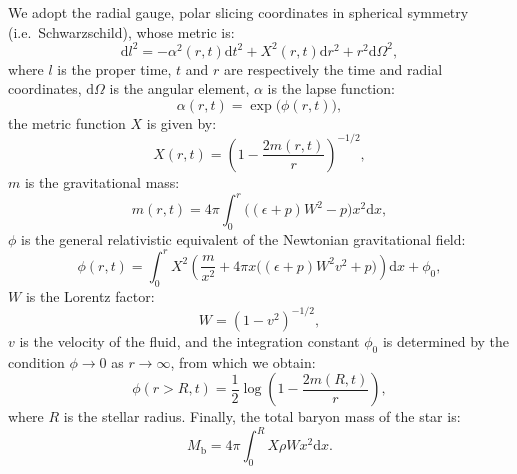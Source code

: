 \documentclass[aps,prd,twocolumn,a4paper,floatfix,nofootbib,superscriptaddress,nofootinbib]{revtex4}
\begin{document}
We adopt the radial gauge, polar slicing coordinates in spherical symmetry
(i.e.~Schwarzschild), whose metric is:
%
\begin{equation}
\label{eq:metric}
%
\mathrm dl^2= 
-\alpha^2(r,t)\mathrm dt^2 + X^2(r,t) \mathrm dr^2
+r^2\mathrm d\Omega^2,
%
\end{equation}
%
where $l$ is the proper time, $t$ and $r$ are respectively the time and radial
coordinates, $\mathrm d\Omega$ is the angular element, $\alpha$ is the
lapse function:
%
\begin{equation}
\label{eq:alpha}
\alpha(r,t)=\exp\big(\phi(r,t)\big),
\end{equation}
%
the metric function $X$ is given by:
%
\begin{equation}
\label{eq:x}
X(r,t)=\left(1 - \frac{2m(r,t)}r\right)^{-1/2},
\end{equation}
%
$m$ is the gravitational mass:
%
\begin{equation}
\label{eq:m}
m(r,t)=4\pi\int_0^r\big((\epsilon+ p) W^2 -  p\big)x^2\mathrm dx,
\end{equation}
%
$\phi$ is the general relativistic equivalent of the Newtonian gravitational field:
%
\begin{equation}
\label{eq:phi}
\phi(r,t)=\int_0^rX^2\left(\frac{m}{x^2} + 4\pi
x\big((\epsilon+ p) W^2v^2 + p\big)\right)\mathrm dx + \phi_0,
\end{equation}
%
$W$ is the Lorentz factor:
%
\begin{equation}
\label{eq:w}
W=\left(1 - v^2\right)^{-1/2},
\end{equation}
%
$v$ is the velocity of the fluid, and the integration constant $\phi_0$
is determined by the condition $\phi\to 0$ as $r\to \infty$,
from which we obtain:
%
\begin{equation}
\label{eq:phi0}
\phi(r>R,t)=\frac12\log\left(1 - \frac{2m(R,t)}r\right),
\end{equation}
%
where $R$ is the stellar radius.
Finally, the total baryon mass of the star is:
\begin{equation}
\label{eq:mb}
M_\mathrm{b}=4\pi\int_0^RX\rho Wx^2\mathrm dx.
\end{equation}
\end{document}
